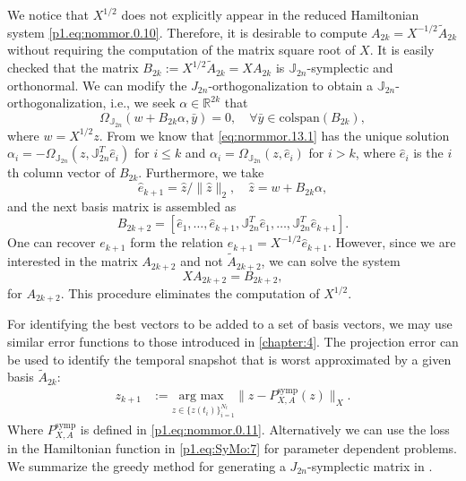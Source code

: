 We notice that $X^{1/2}$ does not explicitly appear in the reduced Hamiltonian system \eqref{p1.eq:nommor.0.10}. Therefore, it is desirable to compute $A_{2k} = X^{-1/2} \tilde A_{2k}$ without requiring the computation of the matrix square root of $X$. It is easily checked that the matrix $B_{2k}:=X^{1/2} \tilde A_{2k} = XA_{2k}$ is $\mathbb J_{2n}$-symplectic and orthonormal. We can modify the $J_{2n}$-orthogonalization to obtain a $\mathbb J_{2n}$-orthogonalization, i.e., we seek $\alpha \in \mathbb R^{2k}$ that
\begin{equation} \label{eq:normmor.13.1}
	\Omega_{\mathbb J_{2n}}\left( w + B_{2k} \alpha, \bar y \right) = 0, \quad \forall \bar y \in \text{colspan}(B_{2k}),
\end{equation}
where $w = X^{1/2}z$. From  we know that \cref{eq:normmor.13.1} has the unique solution $\alpha_i = - \Omega_{\mathbb J_{2n}}(z,\mathbb J_{2n}^T \hat e_i)$ for $i\leq k$ and $\alpha_i = \Omega_{\mathbb J_{2n}}(z,\hat e_i)$ for $i>k$, where $\hat e_i$ is the $i$th column vector of $B_{2k}$. Furthermore, we take 
\begin{equation}
	\hat e_{k+1} = \hat z / \| \hat z \|_2, \quad \hat z = w + B_{2k} \alpha,
\end{equation}
and the next basis matrix is assembled as
\begin{equation}
	B_{2k+2} = [ \hat e_1 , \dots , \hat e_{k+1} , \mathbb J_{2n}^T \hat e_1 , \dots , \mathbb J_{2n}^T \hat e_{k+1} ].
\end{equation}
One can recover $e_{k+1}$ form the relation $e_{k+1} = X^{-1/2} \hat e_{k+1}$. However, since we are interested in the matrix $A_{2k+2}$ and not $\tilde A_{2k+2}$, we can solve the system 
\begin{equation}
	XA_{2k+2} = B_{2k+2},
\end{equation}
for $A_{2k+2}$. This procedure eliminates the computation of $X^{1/2}$.

For identifying the best vectors to be added to a set of basis vectors, we may use similar error functions to those introduced in \cref{chapter:4}. The projection error can be used to identify the temporal snapshot that is worst approximated by a given basis $\tilde A_{2k}$:
\begin{equation} \label{eq:normmor.14}
\begin{aligned}
	z_{k+1} &:= \underset{z\in\{ z(t_i)\}_{i=1}^{N_t}}{\text{arg\ max } }\| z - P_{X,A}^{\text{symp}}(z) \|_X.
\end{aligned}
\end{equation}
Where $P_{X,A}^{\text{symp}}$ is defined in \eqref{p1.eq:nommor.0.11}. Alternatively we can use the loss in the Hamiltonian function in \eqref{p1.eq:SyMo:7} for parameter dependent problems. We summarize the greedy method for generating a $J_{2n}$-symplectic matrix in .


